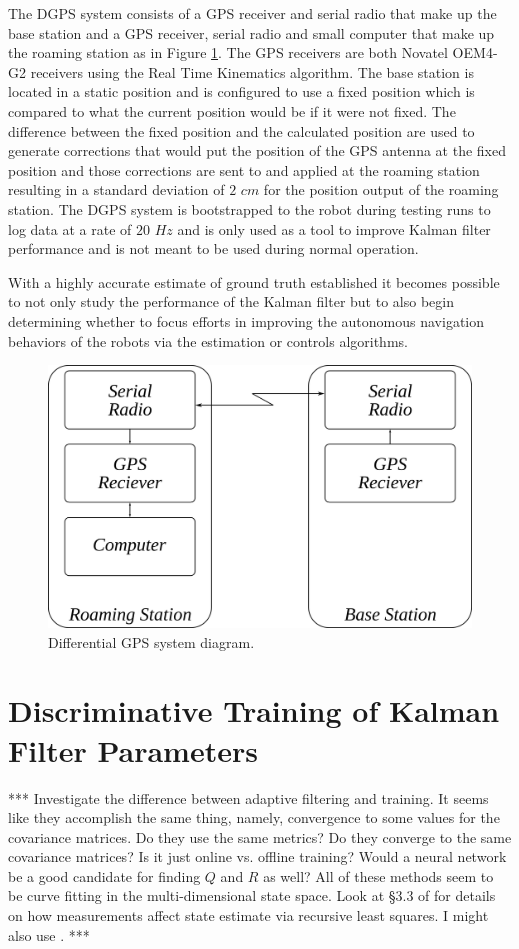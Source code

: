 The DGPS system consists of a GPS receiver and serial radio that make up the base station and a GPS receiver, serial radio and small computer that make up the roaming station as in Figure \ref{fig:dgps}. The GPS receivers are both Novatel OEM4-G2 receivers using the Real Time Kinematics algorithm. The base station is located in a static position and is configured to use a fixed position which is compared to what the current position would be if it were not fixed. The difference between the fixed position and the calculated position are used to generate corrections that would put the position of the GPS antenna at the fixed position and those corrections are sent to and applied at the roaming station resulting in a standard deviation of $2$ $cm$ for the position output of the roaming station. The DGPS system is bootstrapped to the robot during testing runs to log data at a rate of $20$ $Hz$ and is only used as a tool to improve Kalman filter performance and is not meant to be used during normal operation.

With a highly accurate estimate of ground truth established it becomes possible to not only study the performance of the Kalman filter but to also begin determining whether to focus efforts in improving the autonomous navigation behaviors of the robots via the estimation or controls algorithms.

\begin{figure}[ht!]
	\centering
	\includegraphics[width=.6\textwidth]{images/dgps}
	\caption{Differential GPS system diagram.}
	\label{fig:dgps}
\end{figure}

\section{Discriminative Training of Kalman Filter Parameters}
\label{sec:trainingkfparams}
*** Investigate the difference between adaptive filtering and training. It seems like they accomplish the same thing, namely, convergence to some values for the covariance matrices. Do they use the same metrics? Do they converge to the same covariance matrices? Is it just online vs. offline training? Would a neural network be a good candidate for finding $Q$ and $R$ as well? All of these methods seem to be curve fitting in the multi-dimensional state space. Look at \S3.3 of \cite{Simon06OptimalEstimation} for details on how measurements affect state estimate via recursive least squares. I might also use \cite{Orderud05}. ***

